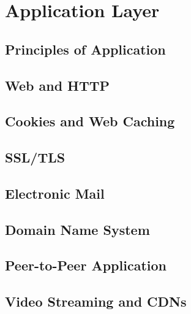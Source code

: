\section{Application Layer}
\subsection{Principles of Application}
\subsection{Web and HTTP}
\subsection{Cookies and Web Caching}
\subsection{SSL/TLS}
\subsection{Electronic Mail}
\subsection{Domain Name System}
\subsection{Peer-to-Peer Application}
\subsection{Video Streaming and CDNs}
